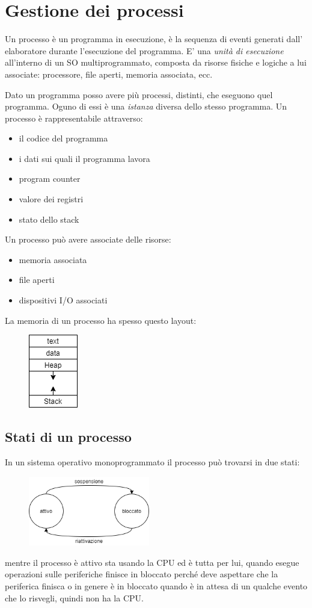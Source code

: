 \section{Gestione dei processi}
Un processo è un programma in esecuzione, è la sequenza di eventi generati dall' elaboratore durante l'esecuzione del programma.
E' una \emph{unità di esecuzione} all'interno di un SO multiprogrammato, composta da risorse fisiche e logiche a lui associate: processore, file aperti, memoria associata, ecc.

Dato un programma posso avere più processi, distinti, che eseguono quel programma. Oguno di essi è una \emph{istanza} diversa dello stesso programma.
Un processo è rappresentabile attraverso:
\begin{itemize}
    \item il codice del programma
    \item i dati sui quali il programma lavora
    \item program counter
    \item valore dei registri
    \item stato dello stack
\end{itemize}
Un processo può avere associate delle risorse:
\begin{itemize}
    \item memoria associata
    \item file aperti
    \item dispositivi I/O associati
\end{itemize}
La memoria di un processo ha spesso questo layout:
\begin{figure}[H]
    \centering
    \includegraphics[]{images/3_Gestione_dei_processi/memory_layout.png}
\end{figure}

\subsection{Stati di un processo}
In un sistema operativo monoprogrammato il processo può trovarsi in due stati:
\begin{figure}[H]
    \centering
    \includegraphics[width=200px]{images/3_Gestione_dei_processi/stati_processo_monoprogrammato.png}
\end{figure}
mentre il processo è attivo sta usando la CPU ed è tutta per lui, quando esegue operazioni sulle periferiche finisce in bloccato perché deve aspettare che la periferica finisca o in genere è in bloccato quando è in attesa di un qualche evento che lo risvegli, quindi non ha la CPU.


